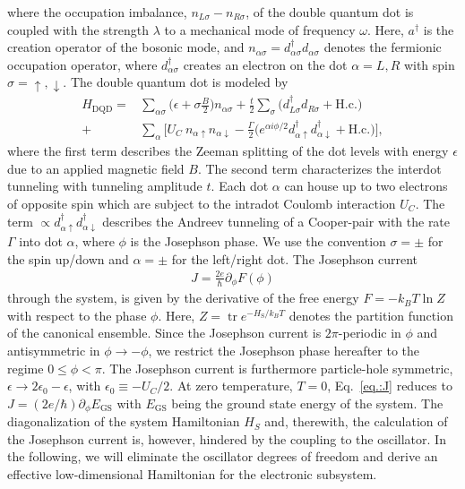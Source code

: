 \documentclass[aps,prb,twocolumn,superscriptaddress,amsmath,amssymb,longbibliography]{revtex4-1}
\newcommand{\tr}{\ensuremath{\operatorname{tr}}}
\newcommand{\up}{{\uparrow}}
\newcommand{\down}{{\downarrow}}
\begin{document}
	where the occupation imbalance, $n_{L\sigma}-n_{R\sigma}$, of the double quantum dot is coupled with the strength $\lambda$ to a 
	mechanical mode of frequency $\omega$. Here, $a^\dag$ is the creation operator of the bosonic mode, and 
	$n_{\alpha\sigma}=d^\dagger_{\alpha\sigma}d_{\alpha\sigma}$ denotes the fermionic occupation operator, where $d^\dagger_{\alpha\sigma}$ 
	creates an electron on the dot  $\alpha=L,R$ with spin $\sigma = \uparrow,\downarrow$.
	The double quantum dot is modeled by~\cite{RozhkovPRB2000a,DrosteJP2012a,HusseinPRB2016a,HusseinPRB2019a}
	\begin{equation}
		\begin{split}
			H_{\textrm{DQD}} {=}
			{ }& \sum_{\alpha\sigma}\Big(\epsilon+\sigma\frac{B}{2} \Big)n_{\alpha\sigma} 
			+\frac{t}{2} \sum_{\sigma} \big(d^\dag_{L\sigma}d_{R\sigma} +\mathrm{H.c.}\big)\\
			+&\sum_{\alpha}\Big[
			U_{C}\:\! n_{\alpha\up}n_{\alpha\down} - \frac{\Gamma}{2} \big( 
			e^{\alpha i\phi/2} d^\dagger_{\alpha\up} d^\dagger_{\alpha\down}+\mathrm{H.c.}
			\big)\Big]\label{eq.:Heff},
		\end{split}
	\end{equation}
	where the first term describes the Zeeman splitting  of the dot levels with energy $\epsilon$ due to an applied magnetic field $B$. 
	The second term characterizes the interdot tunneling with tunneling amplitude $t$. Each dot $\alpha$ can house up to two electrons 
	of opposite spin which are subject to the intradot Coulomb interaction $U_C$. The term $\propto d^\dagger_{\alpha\up} d^\dagger_{\alpha\down}$ describes the Andreev tunneling 
	of a Cooper-pair with the rate $\Gamma$ into dot $\alpha$, where $\phi$ is the Josephson phase. We use
	the convention $\sigma=\pm$ for the spin up/down and $\alpha=\pm$ for the left/right dot.
	The Josephson current~\cite{JosephsonAP1965a,BlochPRB1970a,Beenakker1992a,GolubovRMP2004a}
	\begin{align}
	J=\frac{2e}{\hbar}\partial_\phi F(\phi) \label{eq.:J}
	\end{align}
	through the system, is given by the derivative of the free energy  $F=-k_BT\ln Z$ with respect to the phase $\phi$. Here, $Z=\tr e^{-H_{\textrm{S}}/k_BT}$
	denotes the partition function of the canonical ensemble. Since the Josephson current is $2\pi$-periodic in $\phi$ and antisymmetric in $\phi\to-\phi$, 
	we restrict the Josephson phase  hereafter to the regime $0\leq\phi<\pi$. 
	The Josephson current is furthermore particle-hole symmetric, $\epsilon\to2\epsilon_0-\epsilon$, with $\epsilon_0\equiv-U_C/2$. 
	At zero temperature, $T=0$, Eq.~\eqref{eq.:J} reduces to $J=(2e/\hbar)\partial_\phi E_{\textrm{GS}}$ with
	$E_{\textrm{GS}}$ being the ground state energy of the system. The diagonalization of the system Hamiltonian $H_S$ and, therewith, the calculation 
	of the Josephson current is, however, hindered by the coupling to the oscillator. In the following, we will eliminate the oscillator degrees of freedom 
	and derive an effective low-dimensional Hamiltonian for the electronic subsystem.
	
\end{document}
